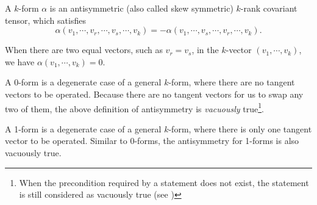 \documentclass[11pt, a4paper]{book}
\begin{document}
\begin{Definition}
  A $k$-form $\alpha$ is an antisymmetric (also called skew symmetric) $k$-rank covariant
  tensor, which satisfies
  \begin{equation}
    \alpha(v_1, \cdots, v_r, \cdots, v_s, \cdots, v_k) = -\alpha(v_1, \cdots, v_s, \cdots, v_r,
    \cdots, v_k).
  \end{equation}
\end{Definition}

\begin{Remark}
  When there are two equal vectors, such as $v_r = v_s$, in the $k$-vector
  $(v_1,\cdots,v_k)$, we have $\alpha(v_1,\cdots,v_k) = 0$.
  
  A 0-form is a degenerate case of a general $k$-form, where there are no tangent vectors
  to be operated. Because there are no tangent vectors for us to swap any two of them, the
  above definition of antisymmetry is \emph{vacuously} true\footnote{When the precondition
    required by a statement does not exist, the statement is still considered as vacuously
    true (see \citet{MunkresTopology2000})}.
    
  A 1-form is a degenerate case of a general $k$-form, where there is only one tangent
  vector to be operated. Similar to 0-forms, the antisymmetry for 1-forms is also
  vacuously true.
\end{Remark}
\end{document}
